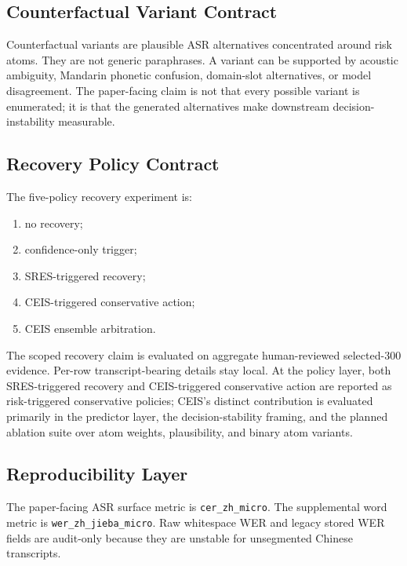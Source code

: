 \documentclass[
]{article}
\providecommand{\tightlist}{%
  \setlength{\itemsep}{0pt}\setlength{\parskip}{0pt}}
\begin{document}
\hypertarget{counterfactual-variant-contract}{%
\subsection{Counterfactual Variant
Contract}\label{counterfactual-variant-contract}}

Counterfactual variants are plausible ASR alternatives concentrated
around risk atoms. They are not generic paraphrases. A variant can be
supported by acoustic ambiguity, Mandarin phonetic confusion,
domain-slot alternatives, or model disagreement. The paper-facing claim
is not that every possible variant is enumerated; it is that the
generated alternatives make downstream decision-instability measurable.

\hypertarget{recovery-policy-contract}{%
\subsection{Recovery Policy Contract}\label{recovery-policy-contract}}

The five-policy recovery experiment is:

\begin{enumerate}
\def\labelenumi{\arabic{enumi}.}
\tightlist
\item
  no recovery;
\item
  confidence-only trigger;
\item
  SRES-triggered recovery;
\item
  CEIS-triggered conservative action;
\item
  CEIS ensemble arbitration.
\end{enumerate}

The scoped recovery claim is evaluated on aggregate human-reviewed
selected-300 evidence. Per-row transcript-bearing details stay local.
At the policy layer, both SRES-triggered recovery and CEIS-triggered
conservative action are reported as risk-triggered conservative
policies; CEIS's distinct contribution is evaluated primarily in the
predictor layer, the decision-stability framing, and the planned
ablation suite over atom weights, plausibility, and binary atom
variants.

\hypertarget{reproducibility-layer}{%
\subsection{Reproducibility Layer}\label{reproducibility-layer}}

The paper-facing ASR surface metric is \texttt{cer\_zh\_micro}. The
supplemental word metric is \texttt{wer\_zh\_jieba\_micro}. Raw
whitespace WER and legacy stored WER fields are audit-only because they
are unstable for unsegmented Chinese transcripts.
\end{document}
